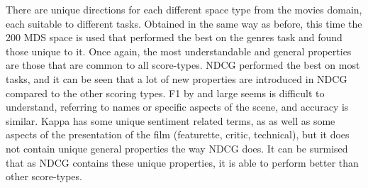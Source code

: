 There are unique directions for each different space type from the movies domain, each suitable to different tasks. Obtained in the same way as before, this time the 200 MDS space is used that performed the best on the genres task and found those unique to it. Once again, the most understandable and general properties are those that are common to all score-types. NDCG performed the best on most tasks, and it can be seen that a lot of new properties are introduced in NDCG compared to the other scoring types. F1 by and large seems is difficult to understand, referring to names or specific aspects of the scene, and accuracy is similar. Kappa has some unique sentiment related terms, as as well as some aspects of the presentation of the film (featurette, critic, technical), but it does not contain unique general properties the way NDCG does. It can be surmised that as NDCG contains these unique properties, it is able to perform better than other score-types.
